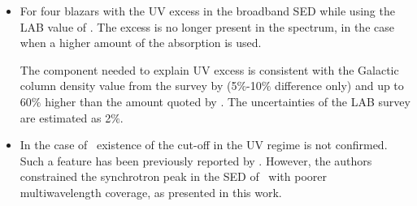 \begin{itemize}
 
  
 \item  For four blazars with the UV excess in the broadband SED while using the LAB value of \nh. The excess is no longer present in the spectrum, in the case when a higher amount of the absorption is used. 

 The component needed to explain UV excess  is consistent with the Galactic column density value from the survey by \cite{Willingale13} (5$\%$-10$\%$ difference only) and up to 60$\%$ higher than the amount quoted by \cite{Kalberla2005}.
 The uncertainties of the LAB survey are estimated as 2$\%$. 
 
 
 \item  In the case of \one\ existence of the cut-off in the UV regime is not confirmed. 
 Such a feature has been previously reported by \cite{Kaufmann2011}. 
 However, the authors constrained the synchrotron peak in the SED of \one\ with poorer multiwavelength coverage, as presented in this work. 
\end{itemize}





 
 
  



 

 
 
 





  












